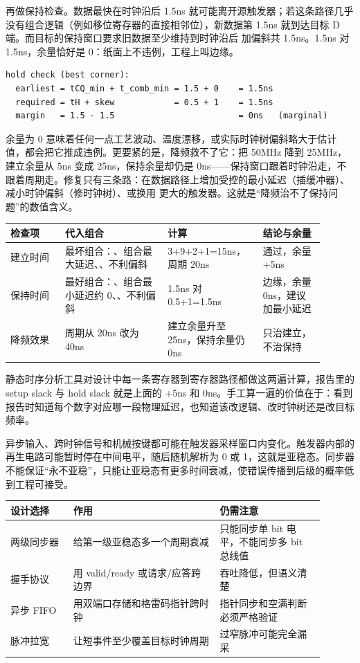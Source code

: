 再做保持检查。数据最快在时钟沿后 1.5ns 就可能离开源触发器；若这条路径几乎没有组合逻辑（例如移位寄存器的直接相邻位），新数据第 1.5ns 就到达目标 D 端。而目标的保持窗口要求旧数据至少维持到时钟沿后  加偏斜共 1.5ns。1.5ns 对 1.5ns，余量恰好是 0：纸面上不违例，工程上叫边缘。

\begin{lstlisting}
hold check (best corner):
  earliest = tCQ_min + t_comb_min = 1.5 + 0    = 1.5ns
  required = tH + skew            = 0.5 + 1    = 1.5ns
  margin   = 1.5 - 1.5                         = 0ns   (marginal)
\end{lstlisting}

余量为 0 意味着任何一点工艺波动、温度漂移，或实际时钟树偏斜略大于估计值，都会把它推成违例。更要紧的是，降频救不了它：把 50MHz 降到 25MHz，建立余量从 5ns 变成 25ns，保持余量却仍是 0ns——保持窗口跟着时钟沿走，不跟着周期走。修复只有三条路：在数据路径上增加受控的最小延迟（插缓冲器）、减小时钟偏斜（修时钟树）、或换用  更大的触发器。这就是“降频治不了保持问题”的数值含义。

\begin{longtable}{L{0.16\linewidth}L{0.3\linewidth}L{0.26\linewidth}L{0.18\linewidth}}
\toprule
检查项 & 代入组合 & 计算 & 结论与余量 \\
\midrule
建立时间 & 最坏组合：、组合最大延迟、、不利偏斜 & 3+9+2+1=15ns，周期 20ns & 通过，余量 +5ns \\
保持时间 & 最好组合：、组合最小延迟约 0、、不利偏斜 & 1.5ns 对 0.5+1=1.5ns & 边缘，余量 0ns，建议加最小延迟 \\
降频效果 & 周期从 20ns 改为 40ns & 建立余量升至 25ns，保持余量仍 0ns & 只治建立，不治保持 \\
\bottomrule
\end{longtable}

静态时序分析工具对设计中每一条寄存器到寄存器路径都做这两遍计算，报告里的 setup slack 与 hold slack 就是上面的 +5ns 和 0ns。手工算一遍的价值在于：看到报告时知道每个数字对应哪一段物理延迟，也知道该改逻辑、改时钟树还是改目标频率。

异步输入、跨时钟信号和机械按键都可能在触发器采样窗口内变化。触发器内部的再生电路可能暂时停在中间电平，随后随机解析为 0 或 1，这就是亚稳态。同步器不能保证“永不亚稳”，只能让亚稳态有更多时间衰减，使错误传播到后级的概率低到工程可接受。

\begin{longtable}{L{0.18\linewidth}L{0.42\linewidth}L{0.3\linewidth}}
\toprule
设计选择 & 作用 & 仍需注意 \\
\midrule
两级同步器 & 给第一级亚稳态多一个周期衰减 & 只能同步单 bit 电平，不能同步多 bit 总线值 \\
握手协议 & 用 valid/ready 或请求/应答跨边界 & 吞吐降低，但语义清楚 \\
异步 FIFO & 用双端口存储和格雷码指针跨时钟 & 指针同步和空满判断必须严格验证 \\
脉冲拉宽 & 让短事件至少覆盖目标时钟周期 & 过窄脉冲可能完全漏采 \\
\bottomrule
\end{longtable}

